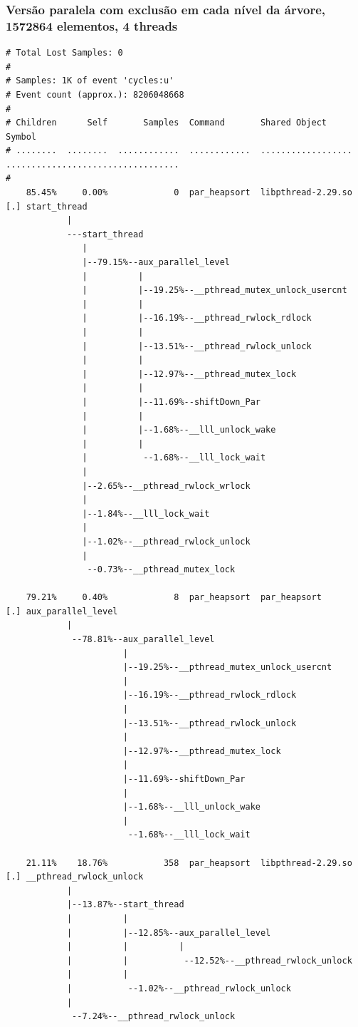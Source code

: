 \documentclass{article}
\begin{document}
\subsubsection{Versão paralela com exclusão em cada nível da árvore, 1572864 elementos, 4 threads}
\scriptsize
\begin{verbatim}
# Total Lost Samples: 0
#
# Samples: 1K of event 'cycles:u'
# Event count (approx.): 8206048668
#
# Children      Self       Samples  Command       Shared Object       Symbol
# ........  ........  ............  ............  ..................  ..................................
#
    85.45%     0.00%             0  par_heapsort  libpthread-2.29.so  [.] start_thread
            |
            ---start_thread
               |
               |--79.15%--aux_parallel_level
               |          |
               |          |--19.25%--__pthread_mutex_unlock_usercnt
               |          |
               |          |--16.19%--__pthread_rwlock_rdlock
               |          |
               |          |--13.51%--__pthread_rwlock_unlock
               |          |
               |          |--12.97%--__pthread_mutex_lock
               |          |
               |          |--11.69%--shiftDown_Par
               |          |
               |          |--1.68%--__lll_unlock_wake
               |          |
               |           --1.68%--__lll_lock_wait
               |
               |--2.65%--__pthread_rwlock_wrlock
               |
               |--1.84%--__lll_lock_wait
               |
               |--1.02%--__pthread_rwlock_unlock
               |
                --0.73%--__pthread_mutex_lock

    79.21%     0.40%             8  par_heapsort  par_heapsort        [.] aux_parallel_level
            |
             --78.81%--aux_parallel_level
                       |
                       |--19.25%--__pthread_mutex_unlock_usercnt
                       |
                       |--16.19%--__pthread_rwlock_rdlock
                       |
                       |--13.51%--__pthread_rwlock_unlock
                       |
                       |--12.97%--__pthread_mutex_lock
                       |
                       |--11.69%--shiftDown_Par
                       |
                       |--1.68%--__lll_unlock_wake
                       |
                        --1.68%--__lll_lock_wait

    21.11%    18.76%           358  par_heapsort  libpthread-2.29.so  [.] __pthread_rwlock_unlock
            |
            |--13.87%--start_thread
            |          |
            |          |--12.85%--aux_parallel_level
            |          |          |
            |          |           --12.52%--__pthread_rwlock_unlock
            |          |
            |           --1.02%--__pthread_rwlock_unlock
            |
             --7.24%--__pthread_rwlock_unlock


\end{verbatim}
\end{document}
